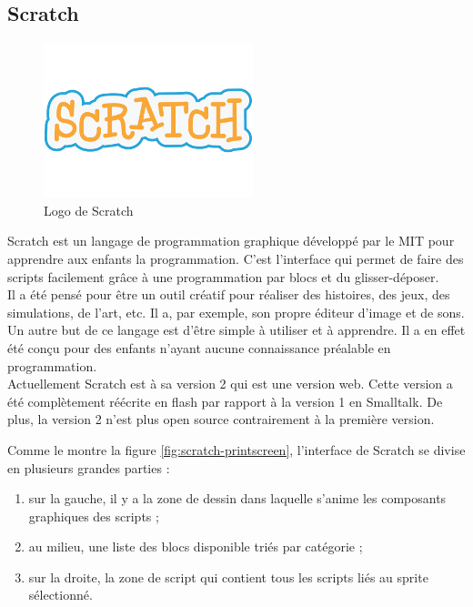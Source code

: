 \subsection{Scratch}

\begin{figure}[!ht]
  \begin{center}
    \includegraphics[scale=0.4]{content/5-related_work/images/scratch}
    \caption{Logo de Scratch}
    \label{fig:scratch}
  \end{center}
\end{figure}
Scratch \cite{scratch} est un langage de programmation graphique développé par le MIT pour apprendre aux enfants la programmation. C'est l'interface qui permet de faire des \glspl{script} facilement grâce à une programmation par \glspl{bloc} et du glisser-déposer.\\

Il a été pensé pour être un outil créatif pour réaliser des histoires, des jeux, des simulations, de l'art, etc. Il a, par exemple, son propre éditeur d'image et de sons. Un autre but de ce langage est d'être simple à utiliser et à apprendre. Il a en effet été conçu pour des enfants n'ayant aucune connaissance préalable en programmation.\\

Actuellement Scratch est à sa version 2 qui est une version web. Cette version a été complètement réécrite en flash par rapport à la version 1 en Smalltalk. De plus, la version 2 n'est plus open source contrairement à la première version.

Comme le montre la figure \ref{fig:scratch-printscreen}, l'interface de Scratch se divise en plusieurs grandes parties :

\begin{enumerate}
\item sur la gauche, il y a la zone de dessin dans laquelle s'anime les composants graphiques des \glspl{script} ;
\item au milieu, une liste des \glspl{bloc} disponible triés par catégorie ;
\item sur la droite, la zone de \gls{script} qui contient tous les \glspl{script} liés au \gls{sprite} sélectionné.
\end{enumerate}

